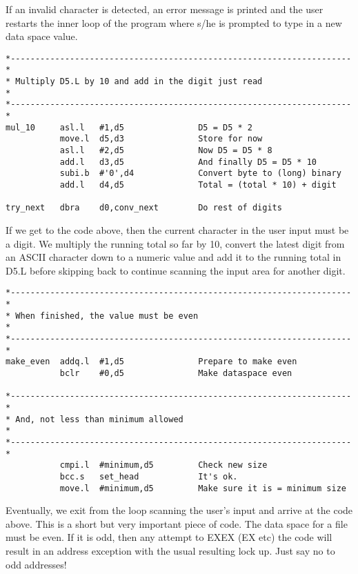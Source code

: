 If an invalid character is detected, an error message is printed and
    the user restarts the inner loop of the program where s/he is prompted to
    type in a new data space value.

\begin{lstlisting}[firstnumber=last,caption={Dataspace Program - Part 9 - Multiply by 10}]
*---------------------------------------------------------------------*
* Multiply D5.L by 10 and add in the digit just read                  *
*---------------------------------------------------------------------*
mul_10     asl.l   #1,d5               D5 = D5 * 2
           move.l  d5,d3               Store for now
           asl.l   #2,d5               Now D5 = D5 * 8
           add.l   d3,d5               And finally D5 = D5 * 10
           subi.b  #'0',d4             Convert byte to (long) binary
           add.l   d4,d5               Total = (total * 10) + digit

try_next   dbra    d0,conv_next        Do rest of digits
\end{lstlisting}

If we get to the code above, then the current character in the user
    input must be a digit. We multiply the running total so far by 10, convert
    the latest digit from an ASCII character down to a numeric value and add
    it to the running total in D5.L before skipping back to continue scanning
    the input area for another digit.

\begin{lstlisting}[firstnumber=last,caption={Dataspace Program - Part 10 - Final Checks}]
*---------------------------------------------------------------------*
* When finished, the value must be even                               *
*---------------------------------------------------------------------*
make_even  addq.l  #1,d5               Prepare to make even
           bclr    #0,d5               Make dataspace even

*---------------------------------------------------------------------*
* And, not less than minimum allowed                                  *
*---------------------------------------------------------------------*
           cmpi.l  #minimum,d5         Check new size
           bcc.s   set_head            It's ok.
           move.l  #minimum,d5         Make sure it is = minimum size
\end{lstlisting}

Eventually, we exit from the loop scanning the user's input and
    arrive at the code above. This is a short but very important piece of
    code. The data space for a file must be even. If it is odd, then any
    attempt to EXEX (EX etc) the code will result in an address exception with
    the usual resulting lock up. Just say no to odd addresses!


